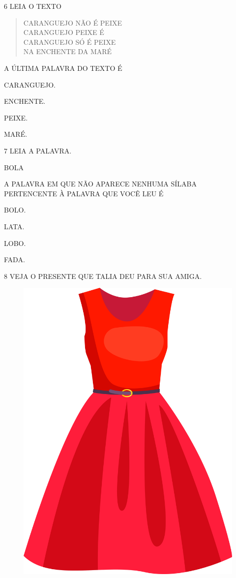 \num{6} LEIA O TEXTO

\begin{myquote}
\begin{verse}
CARANGUEJO NÃO É PEIXE\\
CARANGUEJO PEIXE É\\
CARANGUEJO SÓ É PEIXE\\
NA ENCHENTE DA MARÉ
\end{verse}

\end{myquote}

A ÚLTIMA PALAVRA DO TEXTO É

\begin{escolha}
\item CARANGUEJO.

\item ENCHENTE.

\item PEIXE.

\item MARÉ.
\end{escolha}

\pagebreak

\num{7} LEIA A PALAVRA.

\begin{myquote}
\centering\large{BOLA}
\end{myquote}

A PALAVRA EM QUE NÃO APARECE NENHUMA SÍLABA PERTENCENTE À PALAVRA QUE VOCÊ LEU É 

\begin{escolha}
\item BOLO.

\item LATA.

\item LOBO.

\item FADA.
\end{escolha}


\num{8} VEJA O PRESENTE QUE TALIA DEU PARA SUA AMIGA.

\begin{figure}[H]
\centering
\includegraphics[width=.4\textwidth]{media/image232.png}
\end{figure}

